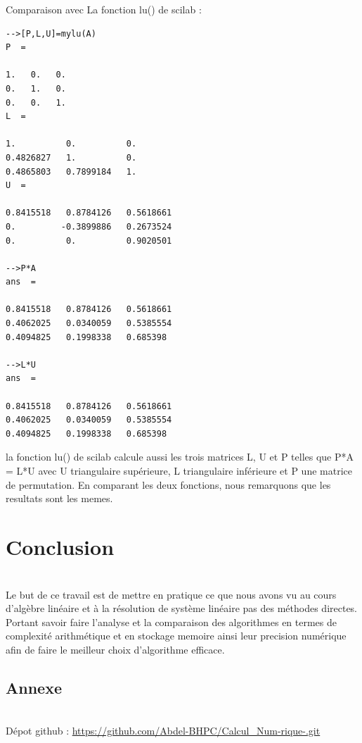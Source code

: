 \documentclass[12pt]{report}
\begin{document}
\newpage

Comparaison avec La fonction lu() de scilab :\\


\begin{lstlisting}
-->[P,L,U]=mylu(A)
P  = 

1.   0.   0.
0.   1.   0.
0.   0.   1.
L  = 

1.          0.          0.
0.4826827   1.          0.
0.4865803   0.7899184   1.
U  = 

0.8415518   0.8784126   0.5618661
0.         -0.3899886   0.2673524
0.          0.          0.9020501

-->P*A
ans  =

0.8415518   0.8784126   0.5618661
0.4062025   0.0340059   0.5385554 
0.4094825   0.1998338   0.685398 

-->L*U
ans  =

0.8415518   0.8784126   0.5618661
0.4062025   0.0340059   0.5385554
0.4094825   0.1998338   0.685398
\end{lstlisting}

la fonction lu() de scilab calcule aussi les trois matrices L, U et P telles que P*A = L*U avec U triangulaire supérieure, L triangulaire inférieure et P une matrice de permutation. En comparant les deux fonctions, nous remarquons que les resultats sont les memes. \\[2cm]


\chapter{Conclusion}\\


Le but de ce travail est de mettre en pratique ce que nous avons vu au cours d'algèbre linéaire et à la résolution de système linéaire pas des méthodes directes. Portant savoir faire l'analyse et la comparaison des algorithmes en termes de complexité arithmétique et en stockage memoire ainsi leur precision numérique afin de faire le meilleur choix d'algorithme efficace. \\[3cm]


\section*{Annexe}\\

Dépot github : 
\url{https://github.com/Abdel-BHPC/Calcul_Num-rique-.git}
\end{document}
